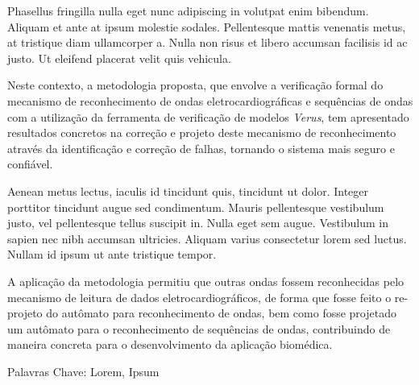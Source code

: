 
Phasellus fringilla nulla eget nunc adipiscing in volutpat enim bibendum. 
Aliquam et ante at ipsum molestie sodales. Pellentesque mattis venenatis metus, 
at tristique diam ullamcorper a. Nulla non risus et libero accumsan facilisis 
id ac justo. Ut eleifend placerat velit quis vehicula. 

Neste contexto, a metodologia proposta, que envolve a verifica\c{c}\~{a}o formal
do mecanismo de reconhecimento de ondas eletrocardiogr\'aficas e
sequ\^{e}ncias de ondas com a utiliza\c{c}\~{a}o da ferramenta de verifica\c{c}\~{a}o
de modelos {\em Verus}, tem apresentado resultados concretos na
corre\c{c}\~{a}o e projeto deste mecanismo de reconhecimento atrav\'es da
identifica\c{c}\~{a}o e corre\c{c}\~{a}o de falhas, tornando o sistema mais seguro e
confi\'avel.

Aenean metus lectus, iaculis id tincidunt quis, 
tincidunt ut dolor. Integer porttitor tincidunt augue sed condimentum. Mauris pellentesque 
vestibulum justo, vel pellentesque tellus suscipit in. Nulla eget sem augue. 
Vestibulum in sapien nec nibh accumsan ultricies. Aliquam varius consectetur lorem sed luctus. 
Nullam id ipsum ut ante tristique tempor.

A aplica\c{c}\~ao da metodologia permitiu que outras ondas fossem
reconhecidas pelo mecanismo de leitura de dados
eletrocardiogr\'aficos, de forma que fosse feito o
re-projeto do autômato para reconhecimento de ondas, bem como
fosse projetado um aut\^omato para o reconhecimento de sequ\^encias
de ondas, contribuindo de maneira concreta para o desenvolvimento
da aplica\c{c}\~{a}o biom\'edica.


Palavras Chave: Lorem, Ipsum
